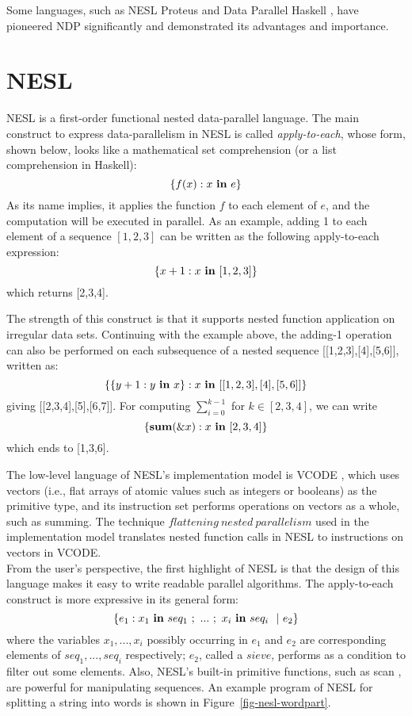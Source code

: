 Some languages, such as NESL \cite{blel95nesl,Blel-imp,Blel96-proof} Proteus \cite{prins93,Ppw95-workeff} and Data
Parallel Haskell \cite{Chak07,PeytonJones08,Lippmeier:2012}, have pioneered NDP significantly and demonstrated its advantages and importance.


\section{NESL}
NESL is a first-order functional nested data-parallel language. The main construct to express data-parallelism in NESL is called \emph{apply-to-each}, whose form, shown below, looks like a mathematical set comprehension (or a list comprehension in Haskell):
$$\{f(x) : x \ \mathbf{in} \ e \} $$
As its name implies, it applies the function $f$ to each element of $e$, and the computation will be executed in parallel.
As an example, adding 1 to each element of a sequence $[1,2,3]$ can be written as the following apply-to-each expression:
$$ \{x+1 : x \ \mathbf{in} \ [1,2,3] \}$$
which returns [2,3,4].

The strength of this construct is that it supports nested function application on irregular data sets. 
Continuing with the example above, the adding-1 operation can also be performed on each subsequence of a nested sequence [[1,2,3],[4],[5,6]], written as: 
$$\{\{y+1: y \ \*{in} \ x\}: x \ \*{in} \ [[1,2,3],[4],[5,6]]\}$$
giving [[2,3,4],[5],[6,7]].
For computing $\sum_{i=0}^{k-1}$ for $k \in [2,3,4]$, we can write
$$\{\*{sum}(\&x) : x \ \*{in} \ [2,3,4]\}$$
which ends to [1,3,6].



The low-level language of NESL's implementation model is VCODE \cite{Blel-imp}, which uses vectors (i.e., flat arrays of atomic values such as integers or booleans) as the primitive type, and its instruction set performs operations on vectors as a whole, such as summing. 
The technique $ flattening \ nested \ parallelism$ \cite{Blel-flatten} used in the implementation model translates nested function calls in NESL to instructions on vectors in VCODE. \\

From the user's perspective, the first highlight of NESL is that the design of this language makes it easy to write readable parallel algorithms. The apply-to-each construct is more expressive in its general form:
$$ \{ e_1 :  x_1 \ \*{in} \ seq_1 \ ; \ ... \ ; \ x_i \  \*{in} \ seq_i \ \ | \ e_2  \}$$
where the variables $x_1, ...,x_i$ possibly occurring in $e_1$ and $e_2$ are corresponding elements of $seq_1,...,seq_i$ respectively; $e_2$, called a $sieve$, performs as a condition to filter out some elements. 
Also, NESL's built-in primitive functions, such as scan \cite{blel89scan}, are powerful for manipulating sequences.
An example program of NESL for splitting a string into words is shown in Figure~\ref{fig-nesl-wordpart}.

